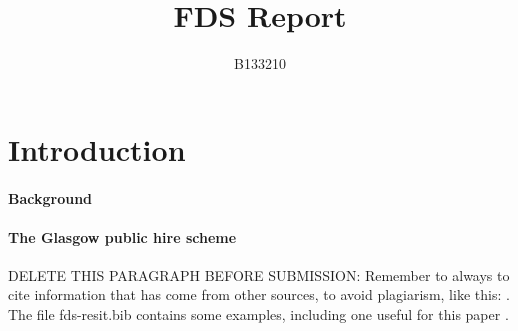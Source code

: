 \documentclass[11pt,a4paper]{article}
\title{FDS Report}
\author{B133210}
\begin{document}
\maketitle


\section{Introduction}


\paragraph{Background}



\paragraph{The Glasgow public hire scheme}


DELETE THIS PARAGRAPH BEFORE SUBMISSION: Remember to always to cite
information that has come from other sources, to avoid plagiarism,
like this: \cite{wiki:plagarism}. The file fds-resit.bib contains some
examples, including one useful for this paper \cite{McPherson2017}.
\end{document}
